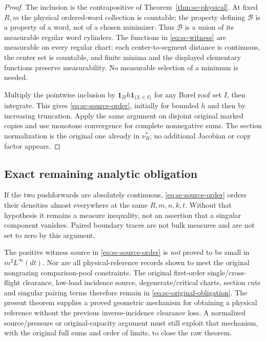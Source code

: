 \begin{proof}
The inclusion is the contrapositive of Theorem~\ref{thm:sc-physical}. At fixed $R,m$ the physical ordered-word collection is countable; the property defining $\mathcal B$ is a property of a word, not of a chosen minimizer. Thus $\mathcal B$ is a union of its measurable regular word cylinders. The functions in \eqref{eq:sc-witness} are measurable on every regular chart: each center-to-segment distance is continuous, the center set is countable, and finite minima and the displayed elementary functions preserve measurability. No measurable selection of a minimum is needed.

Multiply the pointwise inclusion by $\mathbf1_\Pi h\mathbf1_{\{L\in I\}}$ for any Borel roof set $I$, then integrate. This gives \eqref{eq:sc-source-order}, initially for bounded $h$ and then by increasing truncation. Apply the same argument on disjoint original marked copies and use monotone convergence for complete nonnegative sums. The section normalization is the original one already in $\nu_R^*$; no additional Jacobian or copy factor appears.
\end{proof}

\subsection{Exact remaining analytic obligation}
If the two pushforwards are absolutely continuous, \eqref{eq:sc-source-order} orders their densities almost everywhere at the same $R,m,n,k,t$. Without that hypothesis it remains a measure inequality, not an assertion that a singular component vanishes. Paired boundary traces are not bulk measures and are not set to zero by this argument.

The positive witness source in \eqref{eq:sc-source-order} is \emph{not} proved to be small in $m^2L^\infty(dt)$. Nor are all physical-reference records shown to meet the original nongrazing comparison-pool constraints. The original first-order single/cross-flight clearance, low-load incidence source, degenerate/critical charts, section cuts and singular pairing terms therefore remain in \eqref{eq:sc-original-obligation}. The present theorem supplies a proved geometric mechanism for obtaining a physical reference without the previous inverse-incidence clearance loss. A normalized source/pressure or original-capacity argument must still exploit that mechanism, with the original full sums and order of limits, to close the raw theorem.

